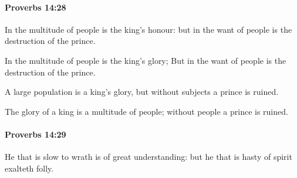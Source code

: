 		\paragraph{Proverbs 14:28} %
			\label{PROVERBS-14-28}

			In the multitude of people is the king’s honour: but in the want of people is the destruction of the prince.

			\begin{versebox}
					\item[BHS] 
					\item[ASV] In the multitude of people is the king's glory; But in the want of people is the destruction of the prince.
					\item[NIV] A large population is a king’s glory, but without subjects a prince is ruined.
					\item[NRSV] The glory of a king is a multitude of people; without people a prince is ruined.
			\end{versebox}

		\paragraph{Proverbs 14:29} %
			\label{PROVERBS-14-29}

			He that is slow to wrath is of great understanding: but he that is hasty of spirit exalteth folly.

